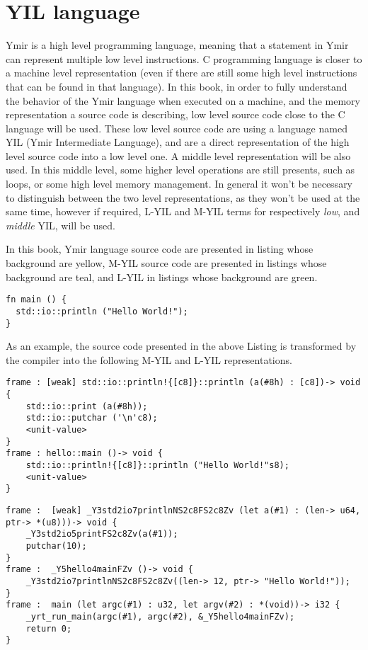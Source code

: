 \section{YIL language}

Ymir is a high level programming language, meaning that a statement in Ymir can
represent multiple low level instructions. C programming language is closer to a
machine level representation (even if there are still some high level
instructions that can be found in that language). In this book, in order to
fully understand the behavior of the Ymir language when executed on a machine,
and the memory representation a source code is describing, low level source code
close to the C language will be used. These low level source code are using a
language named YIL (Ymir Intermediate Language), and are a direct representation
of the high level source code into a low level one. A middle level
representation will be also used. In this middle level, some higher level
operations are still presents, such as loops, or some high level memory
management. In general it won't be necessary to distinguish between the two
level representations, as they won't be used at the same time, however if
required, L-YIL and M-YIL terms for respectively \textit{low}, and
\textit{middle} YIL, will be used.

In this book, Ymir language source code are presented in listing whose
background are yellow, M-YIL source code are presented in listings whose
background are teal, and L-YIL in listings whose background are green.

\begin{lstlisting}[style=coloredverbatim, caption=Source file \textit{hello.yr}, label=lst:hello_world]
fn main () {
  std::io::println ("Hello World!");
}
\end{lstlisting}

As an example, the source code presented in the above Listing is transformed by
the compiler into the following M-YIL and L-YIL representations.

\begin{lstlisting}[style=myilVerb]
frame : [weak] std::io::println!{[c8]}::println (a(#8h) : [c8])-> void {
    std::io::print (a(#8h));
    std::io::putchar ('\n'c8);
    <unit-value>
}
frame : hello::main ()-> void {
    std::io::println!{[c8]}::println ("Hello World!"s8);
    <unit-value>
}
\end{lstlisting}

\begin{lstlisting}[style=lyilVerb]
frame :  [weak] _Y3std2io7printlnNS2c8FS2c8Zv (let a(#1) : (len-> u64, ptr-> *(u8)))-> void {
    _Y3std2io5printFS2c8Zv(a(#1));
    putchar(10);
}
frame :  _Y5hello4mainFZv ()-> void {
    _Y3std2io7printlnNS2c8FS2c8Zv((len-> 12, ptr-> "Hello World!"));
}
frame :  main (let argc(#1) : u32, let argv(#2) : *(void))-> i32 {
    _yrt_run_main(argc(#1), argc(#2), &_Y5hello4mainFZv);
    return 0;
}
\end{lstlisting}


